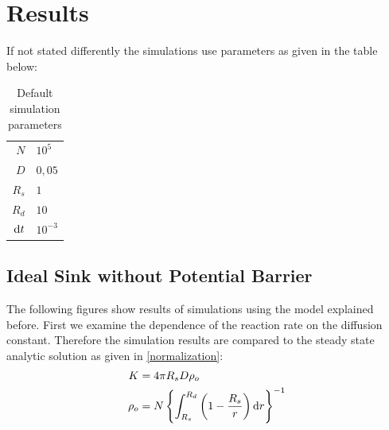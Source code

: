 \section{Results}
If not stated differently the simulations use parameters as given in the table below:
\begin{table}[H]
    \centering
    \begin{tabular}{r|l}
        $N$ & $10^{5}$\\
        $D$ & $0,05$\\
        $R_s$ & $1$ \\
        $R_d$ & $10$ \\
        ${\rm d}t$ & $10^{-3}$
    \end{tabular}
    \caption{Default simulation parameters}
    \label{tab:Parameters}
\end{table}

\subsection{Ideal Sink without Potential Barrier}
The following figures show results of simulations using the model explained before. First we examine the dependence of the reaction rate on the diffusion constant. Therefore the simulation results are compared to the steady state analytic solution as given in \eqref{normalization}:
\begin{align}
    K &= 4 \pi R_s D \rho_o \\
    \rho_o &= N \left\{ \int_{R_s}^{R_d} \left( 1 - \frac{R_s}{r} \right) {\rm d} r \right\}^{-1}
    \label{Steady_state_rate}
\end{align}
\newpage

